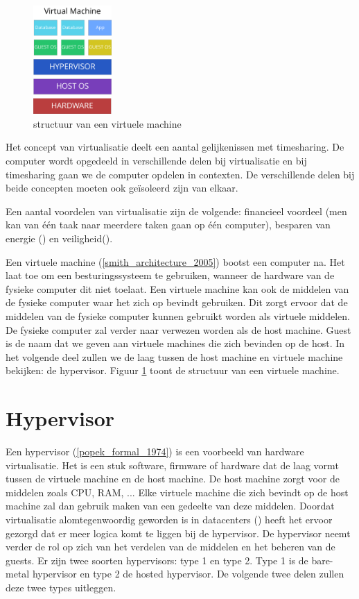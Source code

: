 \documentclass[pdftex,a4paper,12pt,twoside]{report}
\begin{document}
\begin{figure}
    \centering
    \includegraphics[width=3cm]{img/virtual-machine}
    \caption{structuur van een virtuele machine}
    \label{fig:virtualmachine}
\end{figure}

Het concept van virtualisatie deelt een aantal gelijkenissen met timesharing. De computer wordt opgedeeld in verschillende delen bij virtualisatie en bij timesharing gaan we de computer opdelen in contexten. De verschillende delen bij beide concepten moeten ook geïsoleerd zijn van elkaar.

Een aantal voordelen van virtualisatie zijn de volgende: financieel voordeel (men kan van één taak naar meerdere taken gaan op één computer), besparen van energie (\cite{beloglazov_energy_2010}) en veiligheid(\cite{mortleman_security_2009}).

Een virtuele machine (\ref{smith_architecture_2005}) bootst een computer na. Het laat toe om een besturingssysteem te gebruiken, wanneer de hardware van de fysieke computer dit niet toelaat. Een virtuele machine kan ook de middelen van de fysieke computer waar het zich op bevindt gebruiken. Dit zorgt ervoor dat de middelen van de fysieke computer kunnen gebruikt worden als virtuele middelen. De fysieke computer zal verder naar verwezen worden als de host machine. Guest is de naam dat we geven aan virtuele machines die zich bevinden op de host. In het volgende deel zullen we de laag tussen de host machine en virtuele machine bekijken: de hypervisor. Figuur \ref{fig:virtualmachine} toont de structuur van een virtuele machine. 

\section{Hypervisor}

Een hypervisor (\ref{popek_formal_1974}) is een voorbeeld van hardware virtualisatie. Het is een stuk software, firmware of hardware dat de laag vormt tussen de virtuele machine en de host machine. De host machine zorgt voor de middelen zoals CPU, RAM, ... Elke virtuele machine die zich bevindt op de host machine zal dan gebruik maken van een gedeelte van deze middelen. Doordat virtualisatie alomtegenwoordig geworden is in datacenters (\cite{soundararajan_impact_2010}) heeft het ervoor gezorgd dat er meer logica komt te liggen bij de hypervisor. De hypervisor neemt verder de rol op zich van het verdelen van de middelen en het beheren van de guests. Er zijn twee soorten hypervisors: type 1 en type 2. Type 1 is de bare-metal hypervisor en type 2 de hosted hypervisor. De volgende twee delen zullen deze twee types uitleggen.
\end{document}
